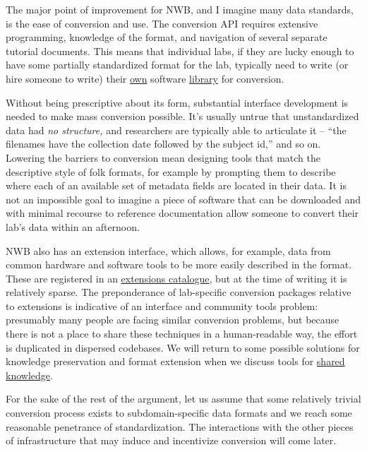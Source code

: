 The major point of improvement for NWB, and I imagine many data
standards, is the ease of conversion and use. The conversion API
requires extensive programming, knowledge of the format, and navigation
of several separate tutorial documents. This means that individual labs,
if they are lucky enough to have some partially standardized format for
the lab, typically need to write (or hire someone to write) their
\href{https://github.com/catalystneuro/tank-lab-to-nwb}{own} software
\href{https://github.com/catalystneuro/mease-lab-to-nwb}{library} for
conversion.

Without being prescriptive about its form, substantial interface
development is needed to make mass conversion possible. It's usually
untrue that unstandardized data had \emph{no structure,} and researchers
are typically able to articulate it -- ``the filenames have the
collection date followed by the subject id,'' and so on. Lowering the
barriers to conversion mean designing tools that match the descriptive
style of folk formats, for example by prompting them to describe where
each of an available set of metadata fields are located in their data.
It is not an impossible goal to imagine a piece of software that can be
downloaded and with minimal recourse to reference documentation allow
someone to convert their lab's data within an afternoon.

NWB also has an extension interface, which allows, for example, data
from common hardware and software tools to be more easily described in
the format. These are registered in an
\href{https://nwb-extensions.github.io/}{extensions catalogue}, but at
the time of writing it is relatively sparse. The preponderance of
lab-specific conversion packages relative to extensions is indicative of
an interface and community tools problem: presumably many people are
facing similar conversion problems, but because there is not a place to
share these techniques in a human-readable way, the effort is duplicated
in dispersed codebases. We will return to some possible solutions for
knowledge preservation and format extension when we discuss tools for
\protect\hyperlink{shared-knowledge}{shared knowledge}.

For the sake of the rest of the argument, let us assume that some
relatively trivial conversion process exists to subdomain-specific data
formats and we reach some reasonable penetrance of standardization. The
interactions with the other pieces of infrastructure that may induce and
incentivize conversion will come later.


